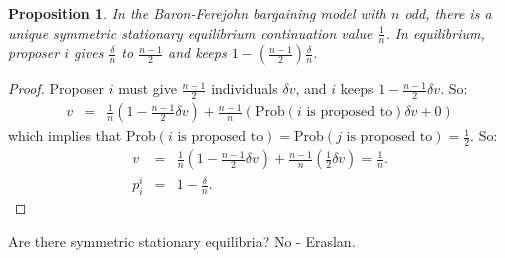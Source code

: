 \documentclass[12pt]{article}
\newtheorem{propo}{Proposition}[section]
\newcommand{\n}{\noindent}
\newcommand{\s}{\vspace{5mm}}
\begin{document}
\s
\n\begin{propo}  In the Baron-Ferejohn bargaining model with $n$ odd, there is a unique symmetric stationary equilibrium continuation value $\frac{1}{n}$.  In equilibrium, proposer $i$ gives $\frac{\delta}{n}$ to $\frac{n-1}{2}$ and keeps $1-\left(\frac{n-1}{2}\right)\frac{\delta}{n}$.
\end{propo}
\begin{proof}  Proposer $i$ must give $\frac{n-1}{2}$ individuals $\delta v$, and $i$ keeps $1-\frac{n-1}{2}\delta v$.  So:
\begin{eqnarray*}
v&=&\frac{1}{n}\left(1-\frac{n-1}{2}\delta v\right)+\frac{n-1}{n}\left(\mbox{Prob}(i\mbox{ is proposed to})\delta v+0\right)
\end{eqnarray*} which implies that Prob$(i\mbox{ is proposed to})=$Prob$(j\mbox{ is proposed to})=\frac{1}{2}$.  So:
\begin{eqnarray*}
v&=&\frac{1}{n}\left(1-\frac{n-1}{2}\delta v\right)+\frac{n-1}{n}\left(\frac{1}{2}\delta v\right)=\frac{1}{n}.\\
p_i^i&=&1-\frac{\delta}{n}.
\end{eqnarray*}
\end{proof}

\s
\n Are there symmetric stationary equilibria?  No - Eraslan.
\end{document}
